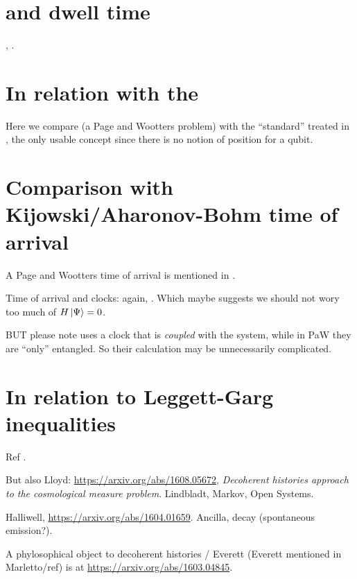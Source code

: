 \section{and dwell time}

\cite[\S 5]{TQM2}, \cite{Halliwell_DwellClocks}.

\section{In relation with the }

Here we compare \cite{Moreva:synthetic, Moreva:illustration}
(a Page and Wootters problem)
with the ``standard'' 
treated in \cite[\S 5.5.2]{TQM2},
the only usable concept since there is no notion of position
for a qubit.

\section{Comparison with Kijowski/Aharonov-Bohm time of arrival}

A Page and Wootters time of arrival is mentioned in \cite{Gambini_PW}.

Time of arrival and clocks: again, \cite{Halliwell_DwellClocks}.
Which maybe suggests we should not wory too much of $H\ket{\Psi} = 0$. 

BUT please note \cite{Halliwell_DwellClocks} uses a clock that is
\emph{coupled} with the system, while in PaW they are ``only'' entangled.
So their calculation may be unnecessarily complicated.

\section{In relation to Leggett-Garg inequalities}
Ref \cite{LeggettGarg+PageWootters}.

But also Lloyd: \url{https://arxiv.org/abs/1608.05672},
\emph{Decoherent histories approach to the cosmological measure problem}.
Lindbladt, Markov, Open Systems.

Halliwell, \url{https://arxiv.org/abs/1604.01659}. Ancilla, decay (spontaneous emission?).

A phylosophical object to decoherent histories / Everett (Everett mentioned in Marletto/ref)
is at
\url{https://arxiv.org/abs/1603.04845}.

